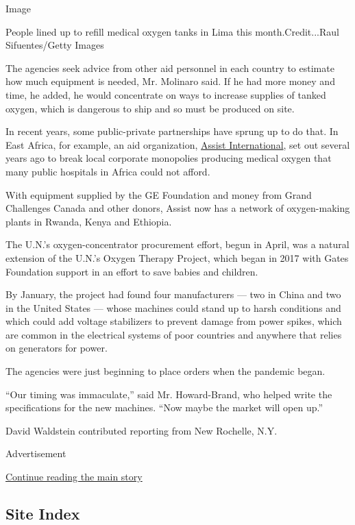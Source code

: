 Image

People lined up to refill medical oxygen tanks in Lima this
month.Credit...Raul Sifuentes/Getty Images

The agencies seek advice from other aid personnel in each country to
estimate how much equipment is needed, Mr. Molinaro said. If he had more
money and time, he added, he would concentrate on ways to increase
supplies of tanked oxygen, which is dangerous to ship and so must be
produced on site.

In recent years, some public-private partnerships have sprung up to do
that. In East Africa, for example, an aid organization,
\href{https://assistinternational.org/global-health/access-to-oxygen/}{Assist
International}, set out several years ago to break local corporate
monopolies producing medical oxygen that many public hospitals in Africa
could not afford.

With equipment supplied by the GE Foundation and money from Grand
Challenges Canada and other donors, Assist now has a network of
oxygen-making plants in Rwanda, Kenya and Ethiopia.

The U.N.'s oxygen-concentrator procurement effort, begun in April, was a
natural extension of the U.N.'s Oxygen Therapy Project, which began in
2017 with Gates Foundation support in an effort to save babies and
children.

By January, the project had found four manufacturers --- two in China
and two in the United States --- whose machines could stand up to harsh
conditions and which could add voltage stabilizers to prevent damage
from power spikes, which are common in the electrical systems of poor
countries and anywhere that relies on generators for power.

The agencies were just beginning to place orders when the pandemic
began.

``Our timing was immaculate,'' said Mr. Howard-Brand, who helped write
the specifications for the new machines. ``Now maybe the market will
open up.''

David Waldstein contributed reporting from New Rochelle, N.Y.

Advertisement

\protect\hyperlink{after-bottom}{Continue reading the main story}

\hypertarget{site-index}{%
\subsection{Site Index}\label{site-index}}

